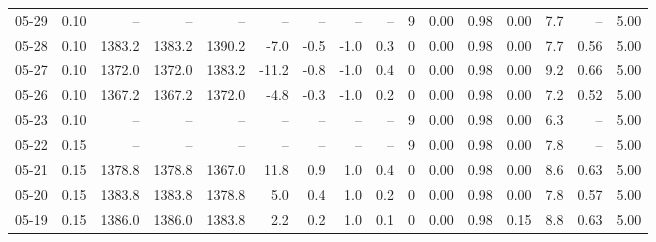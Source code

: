 \begin{threeparttable}
{\begin{tabular}{lrrrrrrrrrrrrrrr}
  05-29 &     0.10 &     -- &     -- &     -- &         -- &             -- &                       -- &                  -- &              9 &       0.00 &      0.98 &           0.00 &              7.7 &              -- &                   5.00 \\
  05-28 &     0.10 & 1383.2 & 1383.2 & 1390.2 &       -7.0 &           -0.5 &                     -1.0 &                 0.3 &              0 &       0.00 &      0.98 &           0.00 &              7.7 &            0.56 &                   5.00 \\
  05-27 &     0.10 & 1372.0 & 1372.0 & 1383.2 &      -11.2 &           -0.8 &                     -1.0 &                 0.4 &              0 &       0.00 &      0.98 &           0.00 &              9.2 &            0.66 &                   5.00 \\
  05-26 &     0.10 & 1367.2 & 1367.2 & 1372.0 &       -4.8 &           -0.3 &                     -1.0 &                 0.2 &              0 &       0.00 &      0.98 &           0.00 &              7.2 &            0.52 &                   5.00 \\
  05-23 &     0.10 &     -- &     -- &     -- &         -- &             -- &                       -- &                  -- &              9 &       0.00 &      0.98 &           0.00 &              6.3 &              -- &                   5.00 \\
  05-22 &     0.15 &     -- &     -- &     -- &         -- &             -- &                       -- &                  -- &              9 &       0.00 &      0.98 &           0.00 &              7.8 &              -- &                   5.00 \\
  05-21 &     0.15 & 1378.8 & 1378.8 & 1367.0 &       11.8 &            0.9 &                      1.0 &                 0.4 &              0 &       0.00 &      0.98 &           0.00 &              8.6 &            0.63 &                   5.00 \\
  05-20 &     0.15 & 1383.8 & 1383.8 & 1378.8 &        5.0 &            0.4 &                      1.0 &                 0.2 &              0 &       0.00 &      0.98 &           0.00 &              7.8 &            0.57 &                   5.00 \\
  05-19 &     0.15 & 1386.0 & 1386.0 & 1383.8 &        2.2 &            0.2 &                      1.0 &                 0.1 &              0 &       0.00 &      0.98 &           0.15 &              8.8 &            0.63 &                   5.00 \\

\end{tabular}}
\end{threeparttable}
